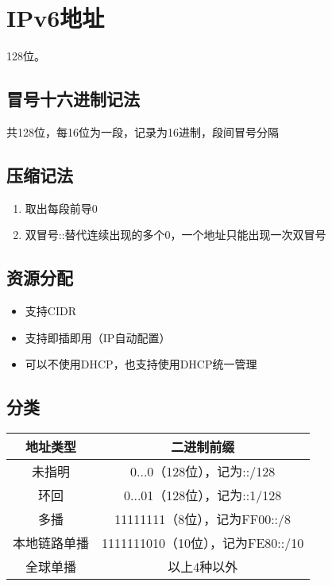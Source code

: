 \section{IPv6地址}
128位。

\subsection{冒号十六进制记法}
共128位，每16位为一段，记录为16进制，段间冒号分隔


\subsection{压缩记法}
\begin{enumerate}
    \item 取出每段前导0
    \item 双冒号::替代连续出现的多个0，一个地址只能出现一次双冒号
\end{enumerate}


\subsection{资源分配}
\begin{itemize}
    \item 支持CIDR
    \item 支持即插即用（IP自动配置）
    \item 可以不使用DHCP，也支持使用DHCP统一管理
\end{itemize}


\subsection{分类}
\begin{center}
    \begin{tabular}{c|c}
        \hline
        地址类型 & 二进制前缀 \\
        \hline
        未指明 & 0...0（128位），记为::/128 \\ 
        \hline
        环回 & 0...01（128位），记为::1/128 \\
        \hline
        多播 & 11111111（8位），记为FF00::/8 \\
        \hline
        本地链路单播 & 1111111010（10位），记为FE80::/10 \\
        \hline
        全球单播 & 以上4种以外 \\
        \hline
    \end{tabular}
\end{center}

